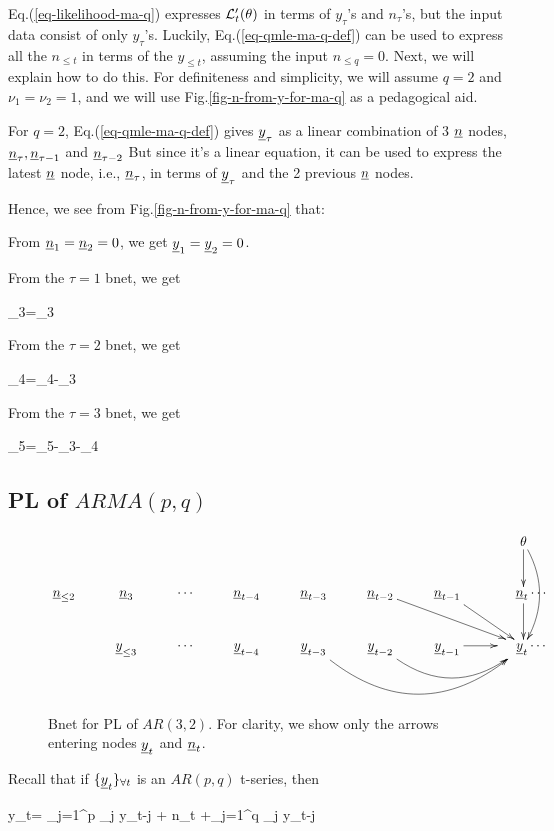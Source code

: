 Eq.(\ref{eq-likelihood-ma-q}) 
expresses ${\cal L}'_t(\theta)$
in terms of $y_\tau$'s and $n_\tau$'s,
but the input data
consist of only $y_\tau$'s.
Luckily,
Eq.(\ref{eq-qmle-ma-q-def})
can be used to express
all the $n_{\leq t}$
in terms of the
$y_{\leq t}$,
assuming the input $n_{\leq q}=0$.
Next, we will
explain how to do this.
For definiteness and simplicity,
we  will assume $q=2$ and
$\nu_1=\nu_2=1$, and we will
use
 Fig.\ref{fig-n-from-y-for-ma-q}
as a pedagogical aid.

For $q=2$,
Eq.(\ref{eq-qmle-ma-q-def})
gives ${\underline{y}}_\tau$ as a linear
combination of 3 ${\underline{n}}$ nodes,
 ${\underline{n}}_\tau,{\underline{n}}_{\tau-1}$ and ${\underline{n}}_{\tau-2}$
But since it's a linear equation,
it can be used to
express the latest ${\underline{n}}$ node,
i.e., ${\underline{n}}_{\tau}$, 
in terms of ${\underline{y}}_{\tau}$
and the 2 previous ${\underline{n}}$
nodes.

Hence, 
we see from Fig.\ref{fig-n-from-y-for-ma-q}
that:

From ${\underline{n}}_1={\underline{n}}_2=0$,
we get ${\underline{y}}_1={\underline{y}}_2=0$.

From the $\tau=1$ bnet, we get 

\beq
\rvn_3=\rvy_3
\eeq

From the $\tau=2$ bnet, we get

\beq
\rvn_4=\rvy_4-\rvn_3
\eeq

From the $\tau=3$ bnet, we get

\beq
\rvn_5=\rvy_5-\rvn_3-\rvn_4
\eeq

\subsection{PL of $ARMA(p,q)$}


\begin{figure}[h!]
$$
\xymatrix{
&&&&&&&\theta\ar[d]\ar@/^1pc/[dd]
\\
\rvn_{\leq 2}
&\rvn_{3}
&\cdots
&\rvn_{t-4}
&\rvn_{t-3}
&\rvn_{t-2}\ar[drr]
&\rvn_{t-1}\ar[dr]
&\;\;\;\;\rvn_{t}\ar[d]
\cdots
\\
\;
&\rvy_{\leq 3}
&\cdots
&\rvy_{t-4}
&\rvy_{t-3}\ar@/_3pc/[rrr]
&\rvy_{t-2}\ar@/_2pc/[rr]
&\rvy_{t-1}\ar[r]
&\;\;\;\;\rvy_{t}
\cdots
\\
\;
}
$$
\caption{Bnet for PL of
$AR(3, 2)$.
For clarity,
we show only the
arrows entering nodes ${\underline{y}}_t$
and ${\underline{n}}_t$.}
\label{fig-qmle-arma-3-2}
\end{figure}

Recall that 
if ${\{{\underline{y}}_t\}_{\forall t}}$ is an 
$AR(p,q)$ t-series, then

\beq
y_t=
\sum_{j=1}^p
\alp_j y_{t-j} + n_t
+\sum_{j=1}^q \nu_j y_{t-j}
\label{eq-qmle-arma-p-q-def}
\eeq

